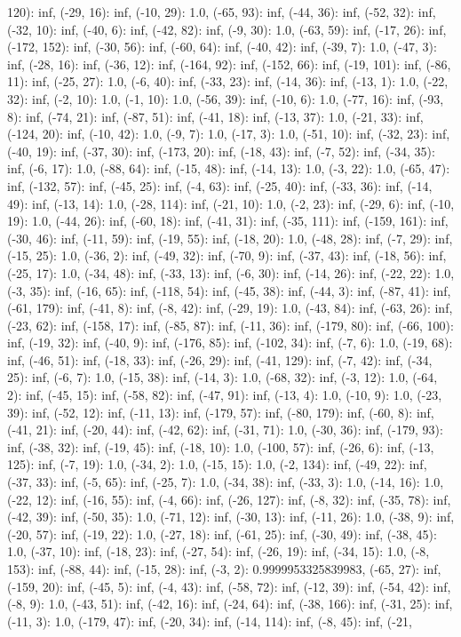 \documentclass[parskip=half]{scrartcl}
\begin{document}
120): inf, (-29, 16): inf, (-10, 29): 1.0, (-65, 93): inf, (-44, 36): inf, (-52, 32): inf, (-32, 10): inf, (-40, 6): inf, (-42, 82): inf, (-9, 30): 1.0, (-63, 59): inf, (-17, 26): inf, (-172, 152): inf, (-30, 56): inf, (-60, 64): inf, (-40, 42): inf, (-39, 7): 1.0, (-47, 3): inf, (-28, 16): inf, (-36, 12): inf, (-164, 92): inf, (-152, 66): inf, (-19, 101): inf, (-86, 11): inf, (-25, 27): 1.0, (-6, 40): inf, (-33, 23): inf, (-14, 36): inf, (-13, 1): 1.0, (-22, 32): inf, (-2, 10): 1.0, (-1, 10): 1.0, (-56, 39): inf, (-10, 6): 1.0, (-77, 16): inf, (-93, 8): inf, (-74, 21): inf, (-87, 51): inf, (-41, 18): inf, (-13, 37): 1.0, (-21, 33): inf, (-124, 20): inf, (-10, 42): 1.0, (-9, 7): 1.0, (-17, 3): 1.0, (-51, 10): inf, (-32, 23): inf, (-40, 19): inf, (-37, 30): inf, (-173, 20): inf, (-18, 43): inf, (-7, 52): inf, (-34, 35): inf, (-6, 17): 1.0, (-88, 64): inf, (-15, 48): inf, (-14, 13): 1.0, (-3, 22): 1.0, (-65, 47): inf, (-132, 57): inf, (-45, 25): inf, (-4, 63): inf, (-25, 40): inf, (-33, 36): inf, (-14, 49): inf, (-13, 14): 1.0, (-28, 114): inf, (-21, 10): 1.0, (-2, 23): inf, (-29, 6): inf, (-10, 19): 1.0, (-44, 26): inf, (-60, 18): inf, (-41, 31): inf, (-35, 111): inf, (-159, 161): inf, (-30, 46): inf, (-11, 59): inf, (-19, 55): inf, (-18, 20): 1.0, (-48, 28): inf, (-7, 29): inf, (-15, 25): 1.0, (-36, 2): inf, (-49, 32): inf, (-70, 9): inf, (-37, 43): inf, (-18, 56): inf, (-25, 17): 1.0, (-34, 48): inf, (-33, 13): inf, (-6, 30): inf, (-14, 26): inf, (-22, 22): 1.0, (-3, 35): inf, (-16, 65): inf, (-118, 54): inf, (-45, 38): inf, (-44, 3): inf, (-87, 41): inf, (-61, 179): inf, (-41, 8): inf, (-8, 42): inf, (-29, 19): 1.0, (-43, 84): inf, (-63, 26): inf, (-23, 62): inf, (-158, 17): inf, (-85, 87): inf, (-11, 36): inf, (-179, 80): inf, (-66, 100): inf, (-19, 32): inf, (-40, 9): inf, (-176, 85): inf, (-102, 34): inf, (-7, 6): 1.0, (-19, 68): inf, (-46, 51): inf, (-18, 33): inf, (-26, 29): inf, (-41, 129): inf, (-7, 42): inf, (-34, 25): inf, (-6, 7): 1.0, (-15, 38): inf, (-14, 3): 1.0, (-68, 32): inf, (-3, 12): 1.0, (-64, 2): inf, (-45, 15): inf, (-58, 82): inf, (-47, 91): inf, (-13, 4): 1.0, (-10, 9): 1.0, (-23, 39): inf, (-52, 12): inf, (-11, 13): inf, (-179, 57): inf, (-80, 179): inf, (-60, 8): inf, (-41, 21): inf, (-20, 44): inf, (-42, 62): inf, (-31, 71): 1.0, (-30, 36): inf, (-179, 93): inf, (-38, 32): inf, (-19, 45): inf, (-18, 10): 1.0, (-100, 57): inf, (-26, 6): inf, (-13, 125): inf, (-7, 19): 1.0, (-34, 2): 1.0, (-15, 15): 1.0, (-2, 134): inf, (-49, 22): inf, (-37, 33): inf, (-5, 65): inf, (-25, 7): 1.0, (-34, 38): inf, (-33, 3): 1.0, (-14, 16): 1.0, (-22, 12): inf, (-16, 55): inf, (-4, 66): inf, (-26, 127): inf, (-8, 32): inf, (-35, 78): inf, (-42, 39): inf, (-50, 35): 1.0, (-71, 12): inf, (-30, 13): inf, (-11, 26): 1.0, (-38, 9): inf, (-20, 57): inf, (-19, 22): 1.0, (-27, 18): inf, (-61, 25): inf, (-30, 49): inf, (-38, 45): 1.0, (-37, 10): inf, (-18, 23): inf, (-27, 54): inf, (-26, 19): inf, (-34, 15): 1.0, (-8, 153): inf, (-88, 44): inf, (-15, 28): inf, (-3, 2): 0.9999953325839983, (-65, 27): inf, (-159, 20): inf, (-45, 5): inf, (-4, 43): inf, (-58, 72): inf, (-12, 39): inf, (-54, 42): inf, (-8, 9): 1.0, (-43, 51): inf, (-42, 16): inf, (-24, 64): inf, (-38, 166): inf, (-31, 25): inf, (-11, 3): 1.0, (-179, 47): inf, (-20, 34): inf, (-14, 114): inf, (-8, 45): inf, (-21, 
\end{document}
